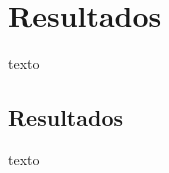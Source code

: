 
\chapter{Resultados\label{chap:Resultados}}


texto

\section{Resultados}

texto \cite{vogt2002multiple}


